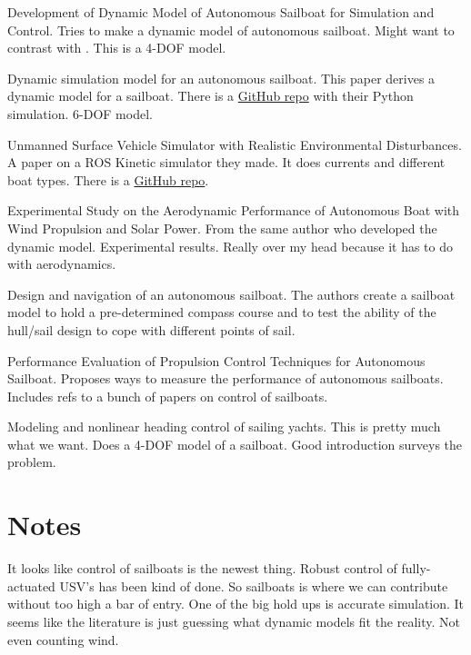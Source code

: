 \documentclass[conference]{IEEEtran}
\begin{document}
\cite{Setiawan2020} Development of Dynamic Model of Autonomous Sailboat for Simulation and Control. Tries to make a dynamic model of autonomous sailboat. Might want to contrast with \cite{Buehler2018}. This is a 4-DOF model.

\cite{Buehler2018} Dynamic simulation model for an autonomous sailboat. This paper derives a dynamic model for a sailboat. There is a \href{https://github.com/simonkohaut/stda-sailboat-simulator/tree/master/src}{GitHub repo} with their Python simulation. 6-DOF model.

\cite{Paravisi2019} Unmanned Surface Vehicle Simulator with Realistic Environmental Disturbances. A paper on a ROS Kinetic simulator they made. It does currents and different boat types. There is a \href{https://github.com/disaster-robotics-proalertas/usv_sim_lsa}{GitHub repo}.

\cite{Setiawan2020} Experimental Study on the Aerodynamic Performance of Autonomous Boat with Wind Propulsion and Solar Power. From the same author who developed the dynamic model. Experimental results. Really over my head because it has to do with aerodynamics.


\cite{Sauzé2006} Design and navigation of an autonomous sailboat. The authors create a sailboat model to hold a pre-determined compass course and to test the ability of the hull/sail design to cope with different points of sail.


\cite{DosSantos2020} Performance Evaluation of Propulsion Control Techniques for Autonomous Sailboat. Proposes ways to measure the performance of autonomous sailboats. Includes refs to a bunch of papers on control of sailboats.

\cite{Xiao2014} Modeling and nonlinear heading control of sailing yachts. This is pretty much what we want. Does a 4-DOF model of a sailboat. Good introduction surveys the problem.


\section{Notes}
It looks like control of sailboats is the newest thing. Robust control of fully-actuated USV's has been kind of done. So sailboats is where we can contribute without too high a bar of entry. One of the big hold ups is accurate simulation. It seems like the literature is just guessing what dynamic models fit the reality. Not even counting wind.


\end{document}

